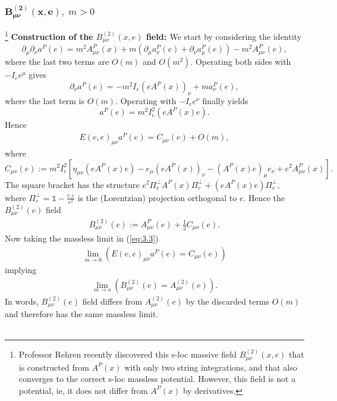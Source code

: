 \documentclass[12pt,a4paper]{article}
\numberwithin{equation}{section}
\begin{document}
\subsubsection{$\boldsymbol{B^{(2)}_{\mu\nu}(x,e)},\;m>0$}
\footnote{Professor Rehren recently discovered this s-loc massive field $B^{(2)}_{\mu\nu}(x,e)$
that is
constructed from $A^P(x)$ with only two string integrations, and that also converges
to the correct s-loc massless potential. However, this field is not a potential, ie,
it does not differ from $A^P(x)$
by derivatives.}
\textbf{\textcolor{blue!50!black}{Construction of the $B^{(2)}_{\mu\nu}(x,e)$ field: } }
We start by considering the identity
$$
\partial_{\mu} \partial_{\nu} a^P(e)=m^{2} A_{\mu \nu}^{P}(x)+m\left(\partial_{\mu} a^P_{\nu}(e)+\partial_{\nu} a^P_{\mu}(e)\right)-m^{2} A^P_{\mu \nu}(e),
$$
where the last two terms are $O(m)$ and $O\left(m^{2}\right)$. Operating both sides with $-I_ee^{\mu}$ gives
$$
\partial_{\nu} a^P(e)=-m^{2} I_{e}\left(e A^{P}(x)\right)_{\nu}+m a^P_{\nu}(e),
$$
where the last term is $O(m)$. Operating with $-I_ee^{\nu}$ finally yields
$$
a^P(e)=m^{2} I_{e}^{2}\left(e A^{P}(x) e\right).
$$
Hence
\begin{align}\label{eq:3.3}
E(e, e)_{\mu \nu} a^P(e)=C_{\mu \nu}(e)+O(m),
\end{align}
where
$$
C_{\mu \nu}(e):=m^{2} I_{e}^{2}\left[\eta_{\mu \nu}\left(e A^{P}(x) e\right)-e_{\mu}\left(e A^{P}(x)\right)_{\nu}-\left(A^{P}(x) e\right)_{\mu} e_{\nu}+e^{2} A_{\mu \nu}^{P}(x)\right].
$$
The square bracket has the structure $e^{2} \Pi_{e}^{\perp} A^{P}(x) \Pi_{e}^{\perp}+\left(e A^{P}(x) e\right) \Pi_{e}^{\perp},$ where $\Pi_{e}^{\perp}=\mathds{1}-\frac{e.e}{e^2}$ is the (Lorentzian) projection orthogonal to $e .$ Hence the $B^{(2)}_{\mu\nu}(e)$ field 
\begin{align}\label{eq:3.4}
B_{\mu \nu}^{(2)}(e):=A^P_{\mu \nu}(e)+\frac{1}{2} C_{\mu \nu}(e).
\end{align}
Now taking the massless limit in (\ref{eq:3.3})
\begin{align*}
\lim_{m\rightarrow 0}\left(E(e, e)_{\mu \nu} a^P(e)=C_{\mu \nu}(e)\right)
\end{align*}
implying
\begin{align*}
\lim_{m\rightarrow o}\left(B_{\mu \nu}^{(2)}(e)=A_{\mu \nu}^{(2)}(e)\right).
\end{align*}
In words, $B_{\mu \nu}^{(2)}(e)$ field differs from $A_{\mu \nu}^{(2)}(e)$ by the discarded terms $O(m)$ and therefore has the same massless limit.  \\\\
\end{document}
